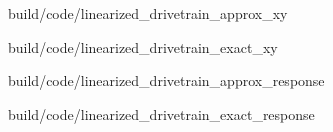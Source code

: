 \begin{bookfigure}
  \begin{minisvg}{build/code/linearized_drivetrain_approx_xy}
    \caption{Linearized drivetrain controller x-y plot (approximate)}
    \label{fig:linearized_drivetrain_approx_xy}
  \end{minisvg}
  \hfill
  \begin{minisvg}{build/code/linearized_drivetrain_exact_xy}
    \caption{Linearized drivetrain controller x-y plot (exact)}
    \label{fig:linearized_drivetrain_exact_xy2}
  \end{minisvg}
  \hfill
  \begin{minisvg}{build/code/linearized_drivetrain_approx_response}
    \caption{Linearized drivetrain controller response (approximate)}
    \label{fig:linearized_drivetrain_approx_response}
  \end{minisvg}
  \hfill
  \begin{minisvg}{build/code/linearized_drivetrain_exact_response}
    \caption{Linearized drivetrain controller response (exact)}
    \label{fig:linearized_drivetrain_exact_response2}
  \end{minisvg}
\end{bookfigure}
